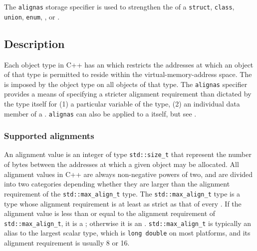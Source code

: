 

\setcounter{table}{0}
\setcounter{footnote}{0}
\setcounter{lstlisting}{0}

The \lstinline!alignas! storage specifier is used to strengthen
the  of a \lstinline!struct!, \lstinline!class!, \lstinline!union!, \lstinline!enum!, , or .

\subsection[Description]{Description}\label{description-alignas}

Each object type in C++ has an  which restricts the addresses at which an object of that type is permitted to reside within the virtual-memory-address space. The  is imposed by the object type on all objects of that type. The \lstinline!alignas! specifier provides a means of specifying a stricter alignment requirement than dictated by the type itself for (1) a particular variable of the type, (2) an individual data member of a . \lstinline!alignas! can also be applied to a  itself, but see .

\subsubsection[Supported alignments]{Supported alignments}\label{description-supported-alignments}

An alignment value is an integer of type \lstinline!std::size_t! that represent the number of bytes between the addresses at which a given object may be allocated.  All alignment values in C++ are always non-negative powers of two, and are divided into two categories depending whether they are larger than the alignment requirement of the \lstinline!std::max_align_t! type.  The \lstinline!std::max_align_t! type is a type whose alignment requirement is at least as strict as that of every .  If the alignment value is less than or equal to the alignment requirement of \lstinline!std::max_align_t!, it is a ; otherwise it is an .  \lstinline!std::max_align_t! is typically an alias to the largest scalar type, which is \lstinline!long double! on most platforms, and its alignment requirement is usually 8 or 16.

